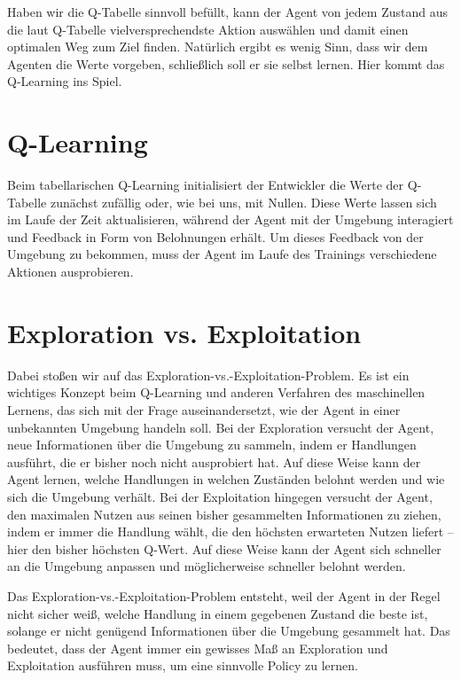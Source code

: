 Haben wir die Q-Tabelle sinnvoll befüllt, kann der Agent von jedem Zustand aus die laut Q-Tabelle vielversprechendste Aktion auswählen und damit einen optimalen Weg zum Ziel finden. Natürlich ergibt es wenig Sinn, dass wir dem Agenten die Werte vorgeben, schließlich soll er sie selbst lernen. Hier kommt das Q-Learning ins Spiel.

\section{Q-Learning}

Beim tabellarischen Q-Learning initialisiert der Entwickler die Werte der Q-Tabelle zunächst zufällig oder, wie bei uns, mit Nullen. Diese Werte lassen sich im Laufe der Zeit aktualisieren, während der Agent mit der Umgebung interagiert und Feedback in Form von Belohnungen erhält. Um dieses Feedback von der Umgebung zu bekommen, muss der Agent im Laufe des Trainings verschiedene Aktionen ausprobieren.

\section{Exploration vs. Exploitation}

Dabei stoßen wir auf das Exploration-vs.-Exploitation-Problem. Es ist ein wichtiges Konzept beim Q-Learning und anderen Verfahren des maschinellen Lernens, das sich mit der Frage auseinandersetzt, wie der Agent in einer unbekannten Umgebung handeln soll. Bei der Exploration versucht der Agent, neue Informationen über die Umgebung zu sammeln, indem er Handlungen ausführt, die er bisher noch nicht ausprobiert hat. Auf diese Weise kann der Agent lernen, welche Handlungen in welchen Zuständen belohnt werden und wie sich die Umgebung verhält. Bei der Exploitation hingegen versucht der Agent, den maximalen Nutzen aus seinen bisher gesammelten Informationen zu ziehen, indem er immer die Handlung wählt, die den höchsten erwarteten Nutzen liefert – hier den bisher höchsten Q-Wert. Auf diese Weise kann der Agent sich schneller an die Umgebung anpassen und möglicherweise schneller belohnt werden.

Das Exploration-vs.-Exploitation-Problem entsteht, weil der Agent in der Regel nicht sicher weiß, welche Handlung in einem gegebenen Zustand die beste ist, solange er nicht genügend Informationen über die Umgebung gesammelt hat. Das bedeutet, dass der Agent immer ein gewisses Maß an Exploration und Exploitation ausführen muss, um eine sinnvolle Policy zu lernen.

